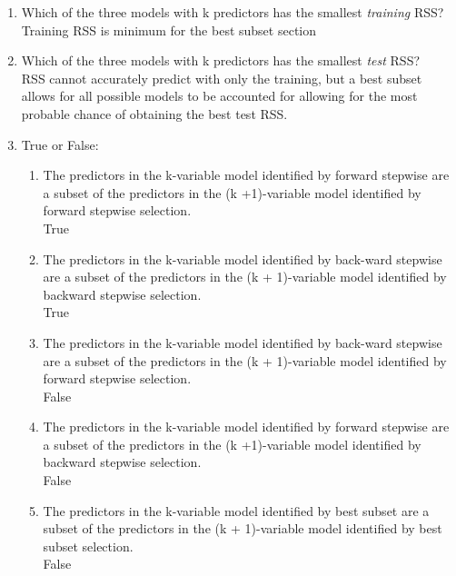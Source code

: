 \documentclass[12pt]{article}
\begin{document}
\medspace

\begin{enumerate}
    \item Which of the three models with k predictors has the smallest \emph{training} RSS?\\
          Training RSS is minimum for the best subset section
    \item Which of the three models with k predictors has the smallest \emph{test} RSS?\\
          RSS cannot accurately predict with only the training, but a best subset allows for all possible models to be accounted for allowing for the most probable chance of obtaining the best test RSS.
    \item True or False:
          \begin{enumerate}[label=(\roman*)]
              \item The predictors in the k-variable model identified by forward stepwise are a subset of the predictors in the (k +1)-variable model identified by forward stepwise selection.\\
                    True
              \item The predictors in the k-variable model identified by back-ward stepwise are a subset of the predictors in the (k + 1)-variable model identified by backward stepwise selection.\\
                    True
              \item The predictors in the k-variable model identified by back-ward stepwise are a subset of the predictors in the (k + 1)-variable model identified by forward stepwise selection.\\
                    False
              \item The predictors in the k-variable model identified by forward stepwise are a subset of the predictors in the (k +1)-variable model identified by backward stepwise selection.\\
                    False
              \item The predictors in the k-variable model identified by best subset are a subset of the predictors in the (k + 1)-variable model identified by best subset selection.\\
                    False
          \end{enumerate}
\end{enumerate}

\end{document}
